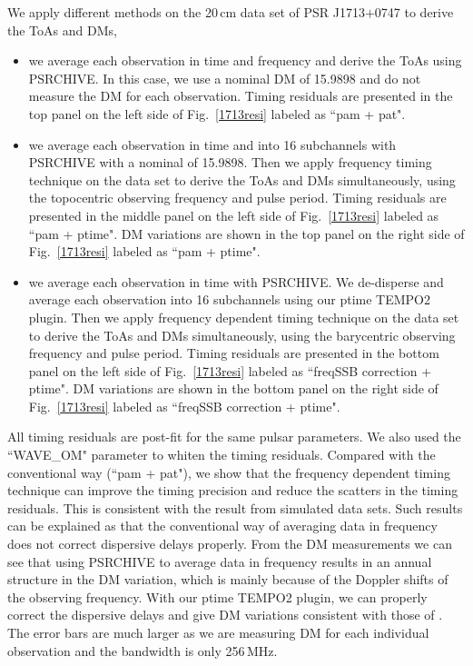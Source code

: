 \documentclass[useAMS,usenatbib]{mn2e}
\begin{document}
We apply different methods on the 20\,cm data set of PSR J1713$+$0747 to derive 
the ToAs and DMs,
\begin{itemize}
\item we average each observation in time and frequency and derive the ToAs using 
PSRCHIVE. In this case, we use a nominal DM of 15.9898 and do not measure the 
DM for each observation. Timing residuals are presented in the top panel on the 
left side of Fig.~\ref{1713resi} labeled as ``pam + pat".
\item we average each observation in time and into 16 subchannels with PSRCHIVE 
with a nominal of 15.9898. Then we apply frequency timing technique on the 
data set to derive the ToAs and DMs simultaneously, using the topocentric 
observing frequency and pulse period. Timing residuals are presented in the 
middle panel on the left side of Fig.~\ref{1713resi} labeled as 
``pam + ptime". DM variations are shown in the top panel on the right side 
of Fig.~\ref{1713resi} labeled as ``pam + ptime". 
\item we average each observation in time with PSRCHIVE. We de-disperse 
and average each observation into 16 subchannels using our ptime TEMPO2 plugin. 
Then we apply frequency dependent timing technique on the data set to derive the ToAs 
and DMs simultaneously, using the barycentric observing frequency and pulse period. 
Timing residuals are presented in the bottom panel on the left side of 
Fig.~\ref{1713resi} labeled as ``freqSSB correction + ptime".
DM variations are shown in the bottom panel on the right side 
of Fig.~\ref{1713resi} labeled as ``freqSSB correction + ptime". 
\end{itemize}

All timing residuals are post-fit for the same pulsar parameters. We also 
used the ``WAVE\_OM" parameter to whiten the timing residuals. Compared 
with the conventional way (``pam + pat"), we show that the frequency dependent
timing technique can improve the timing precision and reduce the scatters 
in the timing residuals. This is consistent with the result from simulated 
data sets. Such results can be explained as that the conventional way 
of averaging data in frequency does not correct dispersive delays properly.
%
From the DM measurements we can see that using PSRCHIVE to average 
data in frequency results in an annual structure in the DM variation, 
which is mainly because of the Doppler shifts of the observing frequency.
%
With our ptime TEMPO2 plugin, we can properly correct the dispersive 
delays and give DM variations consistent with those of \citet{Keith13}.
The error bars are much larger as we are measuring DM for each 
individual observation and the bandwidth is only 256\,MHz.
\end{document}
